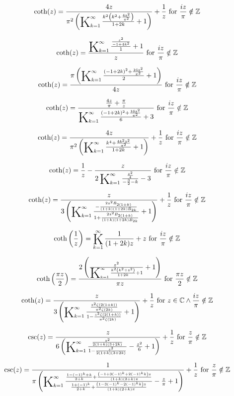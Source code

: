 \documentclass{article}
\newcommand{\bigK}{\mathop{\raisebox{-5pt}{\huge K}}}
\begin{document}
\[\coth (z)=\frac{4 z}{\pi ^2 \left(\bigK_{k=1}^{\infty}\frac{k^2 \left(k^2+\frac{4 z^2}{\pi ^2}\right)}{1+2 k}+1\right)}+\frac{1}{z}\text{ for }\frac{i z}{\pi }\notin \mathbb{Z}\] 

\[\coth (z)=\frac{\bigK_{k=1}^{\infty}\frac{\frac{z^2}{-1+4 k^2}}{1}+1}{z}\text{ for }\frac{i z}{\pi }\notin \mathbb{Z}\] 

\[\coth (z)=\frac{\pi  \left(\bigK_{k=1}^{\infty}\frac{(-1+2 k)^2+\frac{16 z^2}{\pi ^2}}{2}+1\right)}{4 z}\text{ for }\frac{i z}{\pi }\notin \mathbb{Z}\] 

\[\coth (z)=\frac{\frac{4 z}{\pi }+\frac{\pi }{z}}{\bigK_{k=1}^{\infty}\frac{(-1+2 k)^2+\frac{16 z^2}{\pi ^2}}{6}+3}\text{ for }\frac{i z}{\pi }\notin \mathbb{Z}\] 

\[\coth (z)=\frac{4 z}{\pi ^2 \left(\bigK_{k=1}^{\infty}\frac{k^4+\frac{4 k^2 z^2}{\pi ^2}}{1+2 k}+1\right)}+\frac{1}{z}\text{ for }\frac{i z}{\pi }\notin \mathbb{Z}\] 

\[\coth (z)=\frac{1}{z}-\frac{z}{2 \bigK_{k=1}^{\infty}\frac{\frac{z^2}{4}}{-\frac{3}{2}-k}-3}\text{ for }\frac{i z}{\pi }\notin \mathbb{Z}\] 

\[\coth (z)=\frac{z}{3 \left(\bigK_{k=1}^{\infty}\frac{-\frac{2 z^2 B_{2 (1+k)}}{(1+k) (1+2 k) B_{2 k}}}{1+\frac{2 z^2 B_{2 (1+k)}}{(1+k) (1+2 k) B_{2 k}}}+1\right)}+\frac{1}{z}\text{ for }\frac{i z}{\pi }\notin \mathbb{Z}\] 

\[\coth \left(\frac{1}{z}\right)=\bigK_{k=1}^{\infty}\frac{1}{(1+2 k) z}+z\text{ for }\frac{i z}{\pi }\notin \mathbb{Z}\] 

\[\coth \left(\frac{\pi  z}{2}\right)=\frac{2 \left(\frac{z^2}{\bigK_{k=1}^{\infty}\frac{k^2 \left(k^2+z^2\right)}{1+2 k}+1}+1\right)}{\pi  z}\text{ for }\frac{\pi  z}{2}\notin \mathbb{Z}\] 

\[\coth (z)=\frac{z}{3 \left(\bigK_{k=1}^{\infty}\frac{\frac{z^2 \zeta (2 (1+k))}{\pi ^2 \zeta (2 k)}}{1-\frac{z^2 \zeta (2 (1+k))}{\pi ^2 \zeta (2 k)}}+1\right)}+\frac{1}{z}\text{ for }z\in \mathbb{C}\land \frac{i z}{\pi }\notin \mathbb{Z}\] 

\[\csc (z)=\frac{z}{6 \left(\bigK_{k=1}^{\infty}\frac{\frac{z^2}{2 (1+k) (3+2 k)}}{1-\frac{z^2}{2 (1+k) (3+2 k)}}-\frac{z^2}{6}+1\right)}+\frac{1}{z}\text{ for }\frac{z}{\pi }\notin \mathbb{Z}\] 

\[\csc (z)=\frac{1}{\pi  \left(\bigK_{k=1}^{\infty}\frac{\frac{1-(-1)^k+k}{2+k}+\frac{\left(-1+3 (-1)^k+2 (-1)^k k\right) z}{(1+k) (2+k) \pi }}{\frac{1+(-1)^k}{2+k}+\frac{\left(1-3 (-1)^k-2 (-1)^k k\right) z}{(1+k) (2+k) \pi }}-\frac{z}{\pi }+1\right)}+\frac{1}{z}\text{ for }\frac{z}{\pi }\notin \mathbb{Z}\] 
\end{document}
